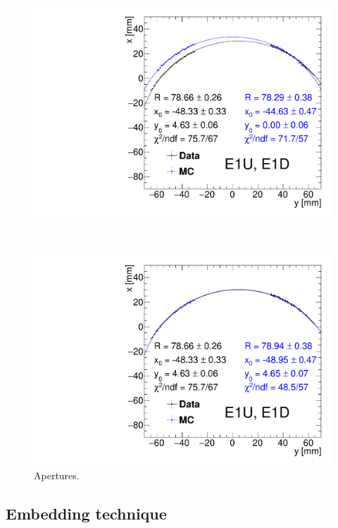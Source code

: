 \begin{figure}[hb]%
\caption[Apertures.]{Apertures.}\label{fig:aperturesWithFit_Sample}%
\centering
\parbox{0.495\textwidth}{
  \centering
  \includegraphics[width=\linewidth,page=1]{graphics/rpSim/Apertures_swapedAxes_withFit_beforeDxShift.pdf}
}~
\parbox{0.495\textwidth}{
  \centering
  \includegraphics[width=\linewidth,page=1]{graphics/rpSim/Apertures_swapedAxes_withFit.pdf}
}%
\end{figure}

\subsection{Embedding technique}